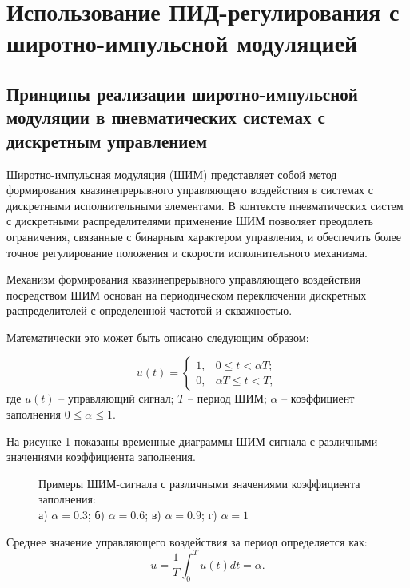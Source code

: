 \section{Использование ПИД-регулирования с широтно-импульсной модуляцией}\label{sec:ch3/sec2}

\subsection*{Принципы реализации широтно-импульсной модуляции в пневматических системах с дискретным управлением}\label{subsec:ch3/sec2/sub1}
Широтно-импульсная модуляция (ШИМ) представляет собой метод формирования квазинепрерывного
управляющего воздействия в системах с дискретными исполнительными элементами.
В контексте пневматических систем с дискретными распределителями применение ШИМ
позволяет преодолеть ограничения, связанные с бинарным характером управления, и обеспечить более
точное регулирование положения и скорости исполнительного механизма.

Механизм формирования квазинепрерывного управляющего воздействия
посредством ШИМ основан на периодическом переключении дискретных
распределителей с определенной частотой и скважностью.

Математически это может быть описано следующим образом:

\begin{equation}
	u(t) = \begin{cases}
		1, & 0 \leq t < \alpha T; \\
		0, & \alpha T \leq t < T,
	\end{cases}
\end{equation}
где $u(t)$ -- управляющий сигнал;
$T$ -- период ШИМ;
$\alpha$ -- коэффициент заполнения $0 \leq \alpha \leq 1$.

На рисунке \ref{fig:ch3:pwm_example} показаны временные диаграммы ШИМ-сигнала
с различными значениями коэффициента заполнения.

\begin{figure}[ht]
	\caption{Примеры ШИМ-сигнала с различными значениями коэффициента заполнения:\\
		а) $\alpha = \num{0.3}$; б) $\alpha = \num{0.6}$; в) $\alpha = \num{0.9}$; г) $\alpha = \num{1}$}
	\label{fig:ch3:pwm_example}
\end{figure}

Среднее значение управляющего воздействия за период определяется как:
\begin{equation}
	\bar{u} = \frac{1}{T} \int_0^T u(t) dt = \alpha.
\end{equation}

